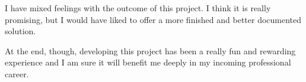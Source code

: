 \documentclass[a4paper,11pt,titlepage,abstract,numbers=noenddot,automark,mnsy,intlimits,rgb,dvipsnames]{report}
\begin{document}
I have mixed feelings with the outcome of this project. I think it is really promising, but I would have liked to
offer a more finished and better documented solution.

At the end, though, developing this project has been a really fun and rewarding experience and I am sure it will
benefit me deeply in my incoming professional career.


\end{document}
